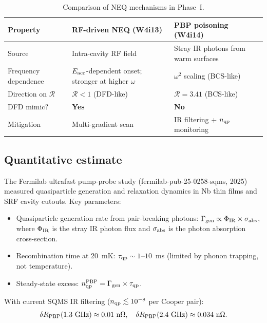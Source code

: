 \documentclass[11pt]{article}
\theoremstyle{definition}
\theoremstyle{remark}
\begin{document}
\begin{table}[H]
\centering
\caption{Comparison of NEQ mechanisms in Phase~I.}
\label{tab:neq_comparison}
\renewcommand{\arraystretch}{1.3}
\begin{tabular}{@{}p{3cm}p{5cm}p{5cm}@{}}
\toprule
\textbf{Property} & \textbf{RF-driven NEQ (W4i13)} &
  \textbf{PBP poisoning (W4i14)} \\
\midrule
Source & Intra-cavity RF field & Stray IR photons from warm surfaces \\
Frequency dependence & $E_{\rm acc}$-dependent onset; stronger at
  higher $\omega$ & $\omega^2$ scaling (BCS-like) \\
Direction on $\mathcal{R}$ & $\mathcal{R} < 1$ (DFD-like) &
  $\mathcal{R} = 3.41$ (BCS-like) \\
DFD mimic? & \textbf{Yes} & \textbf{No} \\
Mitigation & Multi-gradient scan & IR filtering + $n_{\rm qp}$ monitoring \\
\bottomrule
\end{tabular}
\end{table}

\subsection{Quantitative estimate}

The Fermilab ultrafast pump-probe study (fermilab-pub-25-0258-sqms, 2025)
measured quasiparticle generation and relaxation dynamics in Nb thin films
and SRF cavity cutouts. Key parameters:

\begin{itemize}[nosep]
\item Quasiparticle generation rate from pair-breaking photons:
  $\Gamma_{\rm gen} \propto \Phi_{\rm IR} \times \sigma_{\rm abs}$,
  where $\Phi_{\rm IR}$ is the stray IR photon flux and
  $\sigma_{\rm abs}$ is the photon absorption cross-section.
\item Recombination time at 20~mK: $\tau_{\rm qp} \sim 1$--$10$~ms
  (limited by phonon trapping, not temperature).
\item Steady-state excess: $n_{\rm qp}^{\rm PBP} = \Gamma_{\rm gen}
  \times \tau_{\rm qp}$.
\end{itemize}

With current SQMS IR filtering ($n_{\rm qp} \lesssim 10^{-8}$ per
Cooper pair):
\begin{equation}
\delta R_{\rm PBP}(1.3~\text{GHz}) \approx 0.01~\text{n}\Omega, \quad
\delta R_{\rm PBP}(2.4~\text{GHz}) \approx 0.034~\text{n}\Omega.
\end{equation}
\end{document}

